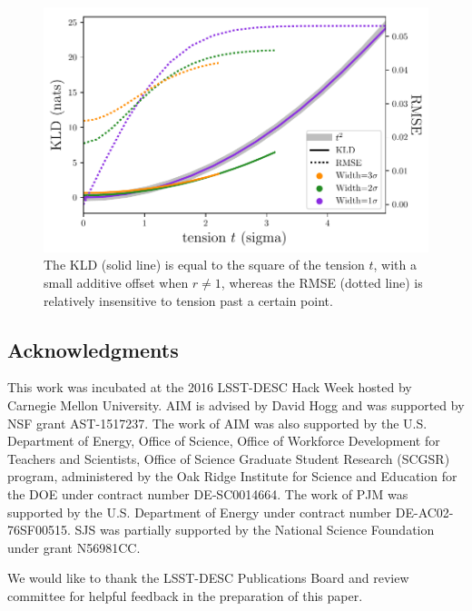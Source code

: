 \documentclass[\docopts]{\docclass}
\begin{document}
\begin{figure}
  \begin{center}
    \includegraphics[width=\columnwidth]{figures/tension.pdf}
    \caption{The KLD (solid line) is equal to the square of the tension $t$, 
with a small additive offset when $r\neq1$, whereas the RMSE (dotted line) is 
relatively insensitive to tension past a certain point.
    \label{fig:tension}}
  \end{center}
\end{figure}

\subsection*{Acknowledgments}


This work was incubated at the 2016 LSST-DESC Hack Week hosted by Carnegie 
Mellon University.
AIM is advised by David Hogg and was supported by NSF grant AST-1517237.
The work of AIM was also supported by the U.S. Department of Energy, Office of 
Science, Office of Workforce Development for Teachers and Scientists, Office of 
Science Graduate Student Research (SCGSR) program, administered by the Oak 
Ridge Institute for Science and Education for the DOE under contract number 
DE‐SC0014664.
The work of PJM was supported by the U.S. Department of Energy under contract 
number DE-AC02-76SF00515.
SJS was partially supported by the National Science Foundation under grant 
N56981CC.


We would like to thank the LSST-DESC Publications Board and review committee 
for helpful feedback in the preparation of this paper.





\end{document}
